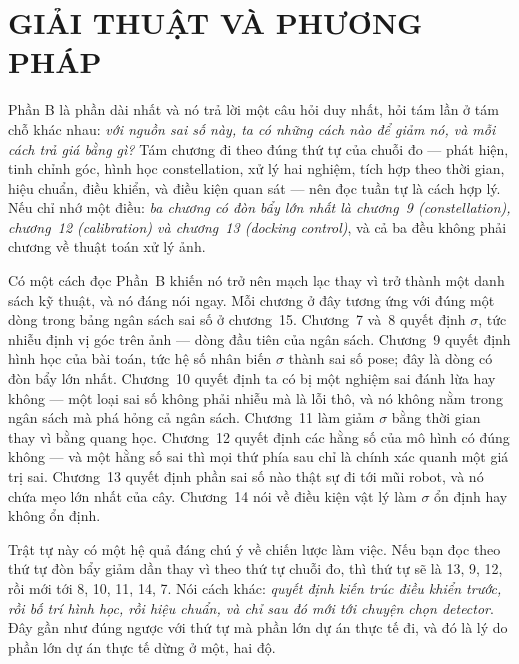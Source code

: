 \documentclass[../marker.tex]{subfiles}
\begin{document}
\part{GIẢI THUẬT VÀ PHƯƠNG PHÁP}
\begin{tomtat}
Phần B là phần dài nhất và nó trả lời một câu hỏi duy nhất, hỏi tám lần ở tám chỗ khác nhau: \emph{với nguồn sai số này, ta có những cách nào để giảm nó, và mỗi cách trả giá bằng gì?} Tám chương đi theo đúng thứ tự của chuỗi đo --- phát hiện, tinh chỉnh góc, hình học constellation, xử lý hai nghiệm, tích hợp theo thời gian, hiệu chuẩn, điều khiển, và điều kiện quan sát --- nên đọc tuần tự là cách hợp lý. Nếu chỉ nhớ một điều: \emph{ba chương có đòn bẩy lớn nhất là chương~9 (constellation), chương~12 (calibration) và chương~13 (docking control)}, và cả ba đều không phải chương về thuật toán xử lý ảnh.
\end{tomtat}

Có một cách đọc Phần~B khiến nó trở nên mạch lạc thay vì trở thành một danh sách kỹ thuật, và nó đáng nói ngay. Mỗi chương ở đây tương ứng với đúng một dòng trong bảng ngân sách sai số ở chương~15. Chương~7 và~8 quyết định \(\sigma\), tức nhiễu định vị góc trên ảnh --- dòng đầu tiên của ngân sách. Chương~9 quyết định hình học của bài toán, tức hệ số nhân biến \(\sigma\) thành sai số pose; đây là dòng có đòn bẩy lớn nhất. Chương~10 quyết định ta có bị một nghiệm sai đánh lừa hay không --- một loại sai số không phải nhiễu mà là lỗi thô, và nó không nằm trong ngân sách mà phá hỏng cả ngân sách. Chương~11 làm giảm \(\sigma\) bằng thời gian thay vì bằng quang học. Chương~12 quyết định các hằng số của mô hình có đúng không --- và một hằng số sai thì mọi thứ phía sau chỉ là chính xác quanh một giá trị sai. Chương~13 quyết định phần sai số nào thật sự đi tới mũi robot, và nó chứa mẹo lớn nhất của cây. Chương~14 nói về điều kiện vật lý làm \(\sigma\) ổn định hay không ổn định.

Trật tự này có một hệ quả đáng chú ý về chiến lược làm việc. Nếu bạn đọc theo thứ tự đòn bẩy giảm dần thay vì theo thứ tự chuỗi đo, thì thứ tự sẽ là 13, 9, 12, rồi mới tới 8, 10, 11, 14, 7. Nói cách khác: \emph{quyết định kiến trúc điều khiển trước, rồi bố trí hình học, rồi hiệu chuẩn, và chỉ sau đó mới tới chuyện chọn detector}. Đây gần như đúng ngược với thứ tự mà phần lớn dự án thực tế đi, và đó là lý do phần lớn dự án thực tế dừng ở một, hai độ.
\end{document}
